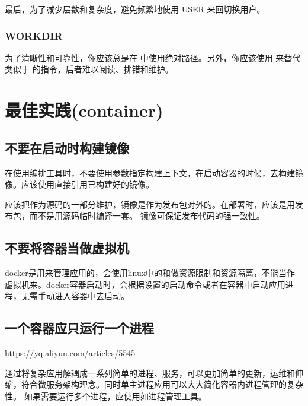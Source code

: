 \documentclass[letterpaper,10pt,english]{sphinxmanual}
\begin{document}
最后，为了减少层数和复杂度，避免频繁地使用 USER 来回切换用户。


\subsubsection{WORKDIR}
\label{\detokenize{docker/appendix:workdir}}
为了清晰性和可靠性，你应该总是在  中使用绝对路径。另外，你应该使用  来替代类似于  的指令，后者难以阅读、排错和维护。


\section{最佳实践(container)}
\label{\detokenize{docker/appendix:container}}

\subsection{不要在启动时构建镜像}
\label{\detokenize{docker/appendix:id11}}
在使用编排工具时，不要使用参数指定构建上下文，在启动容器的时候，去构建镜像。应该使用直接引用已构建好的镜像。

应该把作为源码的一部分维护，镜像是作为发布包对外的。在部署时，应该是用发布包，而不是用源码临时编译一套。
镜像可保证发布代码的强一致性。


\subsection{不要将容器当做虚拟机}
\label{\detokenize{docker/appendix:id12}}
docker是用来管理应用的，会使用linux中的和做资源限制和资源隔离，不能当作虚拟机来。docker容器启动时，会根据设置的启动命令或者在容器中启动应用进程，无需手动进入容器中去启动。


\subsection{一个容器应只运行一个进程}
\label{\detokenize{docker/appendix:id13}}
https://yq.aliyun.com/articles/5545

通过将复杂应用解耦成一系列简单的进程、服务，可以更加简单的更新，运维和伸缩，符合微服务架构理念。同时单主进程应用可以大大简化容器内进程管理的复杂性。
如果需要运行多个进程，应使用如进程管理工具。
\end{document}
